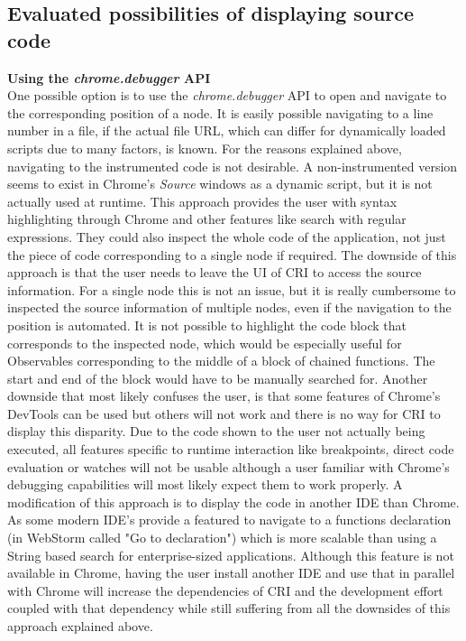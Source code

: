 \subsection{Evaluated possibilities of displaying source code}
\textbf{Using the \emph{chrome.debugger} API}\\
One possible option is to use the \emph{chrome.debugger} API to open and navigate to the corresponding position of a node. It is easily possible navigating to a line number in a file, if the actual file URL, which can differ for dynamically loaded scripts due to many factors, is known. For the reasons explained above, navigating to the instrumented code is not desirable. A non-instrumented version seems to exist in Chrome's \emph{Source} windows as a dynamic script, but it is not actually used at runtime. This approach provides the user with syntax highlighting through Chrome and other features like search with regular expressions. They could also inspect the whole code of the application, not just the piece of code corresponding to a single node if required. The downside of this approach is that the user needs to leave the UI of CRI to access the source information. For a single node this is not an issue, but it is really cumbersome to inspected the source information of multiple nodes, even if the navigation to the position is automated. It is not possible to highlight the code block that corresponds to the inspected node, which would be especially useful for Observables corresponding to the middle of a block of chained functions. The start and end of the block would have to be manually searched for. Another downside that most likely confuses the user, is that some features of Chrome's DevTools can be used but others will not work and there is no way for CRI to display this disparity. Due to the code shown to the user not actually being executed, all features specific to runtime interaction like breakpoints, direct code evaluation or watches will not be usable although a user familiar with Chrome's debugging capabilities will most likely expect them to work properly. A modification of this approach is to display the code in another IDE than Chrome. As some modern IDE's provide a featured to navigate to a functions declaration (in WebStorm called "Go to declaration") which is more scalable than using a String based search for enterprise-sized applications. Although this feature is not available in Chrome, having the user install another IDE and use that in parallel with Chrome will increase the dependencies of CRI and the development effort coupled with that dependency while still suffering from all the downsides of this approach explained above.\\
